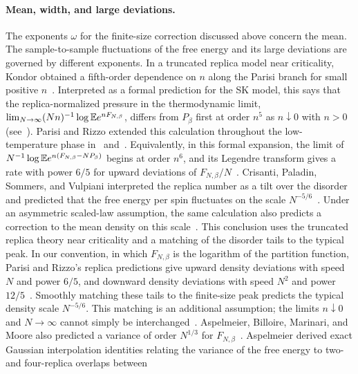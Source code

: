 \paragraph{Mean, width, and large deviations.}
The exponents $\omega$ for the finite-size correction discussed above concern
the mean. The sample-to-sample fluctuations
of the free energy and its large deviations are governed by different
exponents. In a truncated replica model near criticality, Kondor
obtained a fifth-order dependence on $n$ along the Parisi branch for small positive
$n$~\cite[pp.~L129--L130, Eq.~(11)]{Kondor1983}. Interpreted
as a formal prediction for the SK model, this says that the
replica-normalized pressure in the thermodynamic limit,
$\lim_{N\to\infty}(Nn)^{-1}\log\mathbb E e^{nF_{N,\beta}}$, differs from
$P_\beta$ first at order $n^5$ as $n\downarrow0$ with
$n>0$ (see~\cite[pp.~1 and~3]{ParisiRizzo2008}).
Parisi and Rizzo extended this calculation throughout the
low-temperature phase in~\cite{ParisiRizzo2008}
and~\cite[Appendix~B]{ParisiRizzo2009}. Equivalently, in this formal
expansion, the limit of $N^{-1}\log\mathbb E e^{n(F_{N,\beta}-NP_\beta)}$
begins at order $n^6$, and its Legendre transform gives a rate with
power $6/5$ for upward deviations of
$F_{N,\beta}/N$~\cite{ParisiRizzo2008}.
Crisanti, Paladin, Sommers, and
Vulpiani interpreted the replica number
as a tilt over the disorder and predicted that the free energy per spin
fluctuates on the scale
$N^{-5/6}$~\cite{CrisantiEtAl1992Fluctuations}. Under an asymmetric
scaled-law assumption, the same calculation also predicts a correction to the mean
density on this scale~\cite[p.~1331, Eq.~(34) and following
text]{CrisantiEtAl1992Fluctuations}. This conclusion uses the
truncated replica theory near criticality and a matching of the disorder
tails to the typical peak.
In our convention, in which $F_{N,\beta}$ is the logarithm of the partition
function, Parisi and Rizzo's
replica predictions give upward density deviations with speed $N$ and
power $6/5$, and downward density deviations with speed $N^2$ and power
$12/5$~\cite[Eqs.~(12)--(15)]{ParisiRizzo2010}. Smoothly matching these
tails to the finite-size peak predicts the typical density scale
$N^{-5/6}$. This matching is an additional assumption; the limits
$n\downarrow0$ and $N\to\infty$ cannot simply be
interchanged~\cite[Section~VI]{ParisiRizzo2009}.
Aspelmeier, Billoire,
Marinari, and Moore also predicted a variance of order $N^{1/3}$ for
$F_{N,\beta}$~\cite{AspelmeierEtAl2008FiniteSize}.
Aspelmeier derived exact Gaussian interpolation identities relating
the variance of the free energy to two- and four-replica overlaps between
